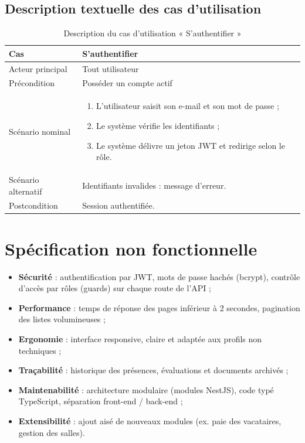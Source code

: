 \documentclass[12pt,a4paper]{report}
\begin{document}
\subsection{Description textuelle des cas d'utilisation}
\begin{table}[H]
\small
\begin{tabularx}{\textwidth}{p{3.5cm} X}
\toprule
\textbf{Cas} & S'authentifier \\
\midrule
Acteur principal & Tout utilisateur \\
Précondition & Posséder un compte actif \\
Scénario nominal &
\begin{enumerate}
  \item L'utilisateur saisit son e-mail et son mot de passe ;
  \item Le système vérifie les identifiants ;
  \item Le système délivre un jeton JWT et redirige selon le rôle.
\end{enumerate} \\
Scénario alternatif & Identifiants invalides : message d'erreur. \\
Postcondition & Session authentifiée. \\
\bottomrule
\end{tabularx}
\caption{Description du cas d'utilisation « S'authentifier »}
\end{table}

\section{Spécification non fonctionnelle}
\begin{itemize}
  \item \textbf{Sécurité} : authentification par JWT, mots de passe hachés
    (bcrypt), contrôle d'accès par rôles (guards) sur chaque route de l'API ;
  \item \textbf{Performance} : temps de réponse des pages inférieur à 2
    secondes, pagination des listes volumineuses ;
  \item \textbf{Ergonomie} : interface responsive, claire et adaptée aux
    profils non techniques ;
  \item \textbf{Traçabilité} : historique des présences, évaluations et
    documents archivés ;
  \item \textbf{Maintenabilité} : architecture modulaire (modules NestJS),
    code typé TypeScript, séparation front-end / back-end ;
  \item \textbf{Extensibilité} : ajout aisé de nouveaux modules (ex. paie
    des vacataires, gestion des salles).
\end{itemize}
\end{document}
